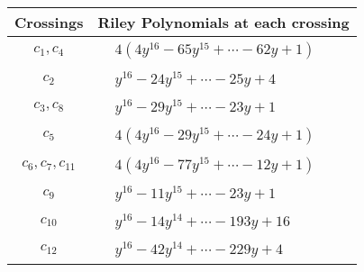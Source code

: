 \documentclass[1p]{elsarticle_modified}
\theoremstyle{definition}
\begin{document}
\begin{tabular}{m{50pt}|m{274pt}}
Crossings & \hspace{64pt}Riley Polynomials at each crossing \\
\hline $$\begin{aligned}c_{1},c_{4}\end{aligned}$$&$\begin{aligned}
&4(4 y^{16}-65 y^{15}+\cdots-62 y+1)
\end{aligned}$\\
\hline $$\begin{aligned}c_{2}\end{aligned}$$&$\begin{aligned}
&y^{16}-24 y^{15}+\cdots-25 y+4
\end{aligned}$\\
\hline $$\begin{aligned}c_{3},c_{8}\end{aligned}$$&$\begin{aligned}
&y^{16}-29 y^{15}+\cdots-23 y+1
\end{aligned}$\\
\hline $$\begin{aligned}c_{5}\end{aligned}$$&$\begin{aligned}
&4(4 y^{16}-29 y^{15}+\cdots-24 y+1)
\end{aligned}$\\
\hline $$\begin{aligned}c_{6},c_{7},c_{11}\end{aligned}$$&$\begin{aligned}
&4(4 y^{16}-77 y^{15}+\cdots-12 y+1)
\end{aligned}$\\
\hline $$\begin{aligned}c_{9}\end{aligned}$$&$\begin{aligned}
&y^{16}-11 y^{15}+\cdots-23 y+1
\end{aligned}$\\
\hline $$\begin{aligned}c_{10}\end{aligned}$$&$\begin{aligned}
&y^{16}-14 y^{14}+\cdots-193 y+16
\end{aligned}$\\
\hline $$\begin{aligned}c_{12}\end{aligned}$$&$\begin{aligned}
&y^{16}-42 y^{14}+\cdots-229 y+4
\end{aligned}$\\
\hline
\end{tabular}\\~\\
\end{document}
